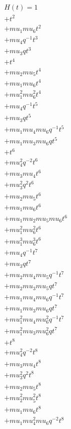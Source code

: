\begin{align*}
H(t) = {}1 \\
  + t^{2} \\
  + mu_1 mu_6 t^{2} \\
  + mu_4 q^{-1} t^{3} \\
  + mu_3 q t^{3} \\
  + t^{4} \\
  + mu_2 mu_5 t^{4} \\
  + mu_1 mu_6 t^{4} \\
  + mu_1^{2} mu_6^{2} t^{4} \\
  + mu_4 q^{-1} t^{5} \\
  + mu_3 q t^{5} \\
  + mu_1 mu_4 mu_6 q^{-1} t^{5} \\
  + mu_1 mu_3 mu_6 q t^{5} \\
  + t^{6} \\
  + mu_4^{2} q^{-2} t^{6} \\
  + mu_3 mu_4 t^{6} \\
  + mu_3^{2} q^{2} t^{6} \\
  + mu_2 mu_5 t^{6} \\
  + mu_1 mu_6 t^{6} \\
  + mu_1 mu_2 mu_5 mu_6 t^{6} \\
  + mu_1^{2} mu_6^{2} t^{6} \\
  + mu_1^{3} mu_6^{3} t^{6} \\
  + mu_4 q^{-1} t^{7} \\
  + mu_3 q t^{7} \\
  + mu_2 mu_4 mu_5 q^{-1} t^{7} \\
  + mu_2 mu_3 mu_5 q t^{7} \\
  + mu_1 mu_4 mu_6 q^{-1} t^{7} \\
  + mu_1 mu_3 mu_6 q t^{7} \\
  + mu_1^{2} mu_4 mu_6^{2} q^{-1} t^{7} \\
  + mu_1^{2} mu_3 mu_6^{2} q t^{7} \\
  + t^{8} \\
  + mu_4^{2} q^{-2} t^{8} \\
  + mu_3 mu_4 t^{8} \\
  + mu_3^{2} q^{2} t^{8} \\
  + mu_2 mu_5 t^{8} \\
  + mu_2^{2} mu_5^{2} t^{8} \\
  + mu_1 mu_6 t^{8} \\
  + mu_1 mu_4^{2} mu_6 q^{-2} t^{8} \\

\end{align*}
